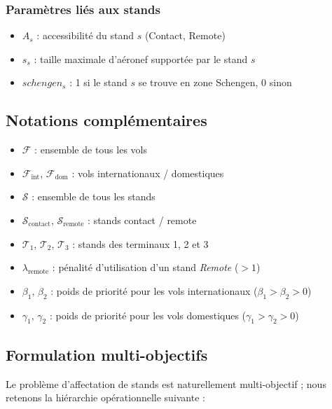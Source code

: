 \subsubsection*{Paramètres liés aux stands}
\begin{itemize}
	\item $A_s$ : accessibilité du stand $s$ (Contact, Remote)
	\item $s_s$ : taille maximale d’aéronef supportée par le stand $s$
	\item $schengen_s$ : 1 si le stand $s$ se trouve en zone Schengen, 0 sinon
\end{itemize}
\vspace{-0.5em}
\subsection*{Notations complémentaires}
\begin{itemize}
	\item $\mathcal{F}$ : ensemble de tous les vols
	\item $\mathcal{F}_{\text{int}}$, $\mathcal{F}_{\text{dom}}$ : vols internationaux / domestiques
	\item $\mathcal{S}$ : ensemble de tous les stands
	\item $\mathcal{S}_{\text{contact}}$, $\mathcal{S}_{\text{remote}}$ : stands contact / remote
	\item $\mathcal{T}_1$, $\mathcal{T}_2$, $\mathcal{T}_3$ : stands des terminaux 1, 2 et 3
	\item $\lambda_{\text{remote}}$ : pénalité d’utilisation d’un stand \textit{Remote} ($>1$)
	\item $\beta_1,\,\beta_2$ : poids de priorité pour les vols internationaux ($\beta_1>\beta_2>0$)
	\item $\gamma_1,\,\gamma_2$ : poids de priorité pour les vols domestiques   ($\gamma_1>\gamma_2>0$)
\end{itemize}
\vspace{-0.8em}
\subsection{Formulation multi-objectifs}

Le problème d’affectation de stands est naturellement multi-objectif ; nous
retenons la hiérarchie opérationnelle suivante :

